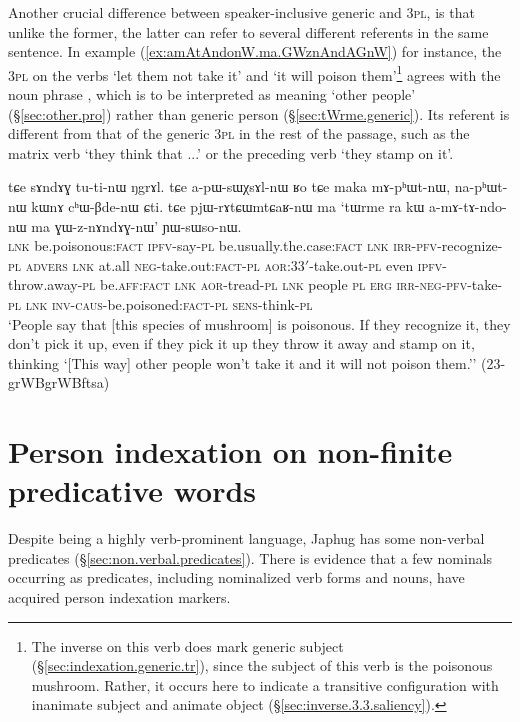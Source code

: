 Another crucial difference between speaker-inclusive generic and \textsc{3pl}, is that unlike the former, the latter can refer to several different referents in the same sentence. In example (\ref{ex:amAtAndonW.ma.GWznAndAGnW}) for instance, the \textsc{3pl} on the verbs  `let them not take it' and  `it will poison them'\footnote{The inverse on this verb does mark generic subject (§\ref{sec:indexation.generic.tr}), since the subject of this verb is the poisonous mushroom. Rather, it occurs here to indicate a transitive configuration with inanimate subject and animate object (§\ref{sec:inverse.3.3.saliency}).} agrees with the noun phrase , which is to be interpreted as meaning `other people' (§\ref{sec:other.pro}) rather than generic person (§\ref{sec:tWrme.generic}). Its referent is different from that of the generic \textsc{3pl} in the rest of the passage, such as the matrix verb  `they think that ...' or the preceding verb  `they stamp on it'.

\begin{exe}
\ex \label{ex:amAtAndonW.ma.GWznAndAGnW}
\gll tɕe sɤndɤɣ tu-ti-nɯ ŋgrɤl. tɕe a-pɯ-sɯχsɤl-nɯ ʁo tɕe maka mɤ-pʰɯt-nɯ, na-pʰɯt-nɯ kɯnɤ cʰɯ-βde-nɯ ɕti. tɕe pjɯ-rɤtɕɯmtɕaʁ-nɯ ma `tɯrme ra kɯ a-mɤ-tɤ-ndo-nɯ ma ɣɯ-z-nɤndɤɣ-nɯ' ɲɯ-sɯso-nɯ. \\
\textsc{lnk} be.poisonous:\textsc{fact} \textsc{ipfv}-say-\textsc{pl} be.usually.the.case:\textsc{fact} \textsc{lnk} \textsc{irr}-\textsc{pfv}-recognize-\textsc{pl} \textsc{advers} \textsc{lnk} at.all \textsc{neg}-take.out:\textsc{fact}-\textsc{pl} \textsc{aor}:3\fl{}3$'$-take.out-\textsc{pl} even \textsc{ipfv}-throw.away-\textsc{pl} be.\textsc{aff}:\textsc{fact} \textsc{lnk} \textsc{aor}-tread-\textsc{pl} \textsc{lnk} people \textsc{pl} \textsc{erg} \textsc{irr}-\textsc{neg}-\textsc{pfv}-take-\textsc{pl} \textsc{lnk} \textsc{inv}-\textsc{caus}-be.poisoned:\textsc{fact}-\textsc{pl} \textsc{sens}-think-\textsc{pl} \\
\glt `People say that [this species of mushroom] is poisonous. If they recognize it, they don't pick it up, even if they pick it up they throw it away and stamp on it, thinking `[This way] other people won't take it and it will not poison them.'' (23-grWBgrWBftsa)
\end{exe}

\section{Person indexation on non-finite predicative words} \label{sec:non.finite.indexation}
 
Despite being a highly verb-prominent language, Japhug has some non-verbal predicates (§\ref{sec:non.verbal.predicates}). There is evidence that a few nominals occurring as predicates, including nominalized verb forms and nouns, have acquired person indexation markers.

